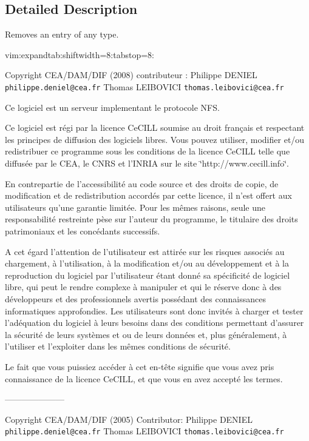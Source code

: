 \subsection{Detailed Description}
Removes an entry of any type. 

vim:expandtab:shiftwidth=8:tabstop=8:

Copyright CEA/DAM/DIF (2008) contributeur : Philippe DENIEL {\tt philippe.deniel@cea.fr} Thomas LEIBOVICI {\tt thomas.leibovici@cea.fr}

Ce logiciel est un serveur implementant le protocole NFS.

Ce logiciel est r\'{e}gi par la licence Ce\-CILL soumise au droit fran\c{c}ais et respectant les principes de diffusion des logiciels libres. Vous pouvez utiliser, modifier et/ou redistribuer ce programme sous les conditions de la licence Ce\-CILL telle que diffus\'{e}e par le CEA, le CNRS et l'INRIA sur le site \char`\"{}http://www.cecill.info\char`\"{}.

En contrepartie de l'accessibilit\'{e} au code source et des droits de copie, de modification et de redistribution accord\'{e}s par cette licence, il n'est offert aux utilisateurs qu'une garantie limit\'{e}e. Pour les m\^{e}mes raisons, seule une responsabilit\'{e} restreinte p\`{e}se sur l'auteur du programme, le titulaire des droits patrimoniaux et les conc\'{e}dants successifs.

A cet \'{e}gard l'attention de l'utilisateur est attir\'{e}e sur les risques associ\'{e}s au chargement, \`{a} l'utilisation, \`{a} la modification et/ou au d\'{e}veloppement et \`{a} la reproduction du logiciel par l'utilisateur \'{e}tant donn\'{e} sa sp\'{e}cificit\'{e} de logiciel libre, qui peut le rendre complexe \`{a} manipuler et qui le r\'{e}serve donc \`{a} des d\'{e}veloppeurs et des professionnels avertis poss\'{e}dant des connaissances informatiques approfondies. Les utilisateurs sont donc invit\'{e}s \`{a} charger et tester l'ad\'{e}quation du logiciel \`{a} leurs besoins dans des conditions permettant d'assurer la s\'{e}curit\'{e} de leurs syst\`{e}mes et ou de leurs donn\'{e}es et, plus g\'{e}n\'{e}ralement, \`{a} l'utiliser et l'exploiter dans les m\^{e}mes conditions de s\'{e}curit\'{e}.

Le fait que vous puissiez acc\'{e}der \`{a} cet en-t\^{e}te signifie que vous avez pris connaissance de la licence Ce\-CILL, et que vous en avez accept\'{e} les termes.

---------------------

Copyright CEA/DAM/DIF (2005) Contributor: Philippe DENIEL {\tt philippe.deniel@cea.fr} Thomas LEIBOVICI {\tt thomas.leibovici@cea.fr}

